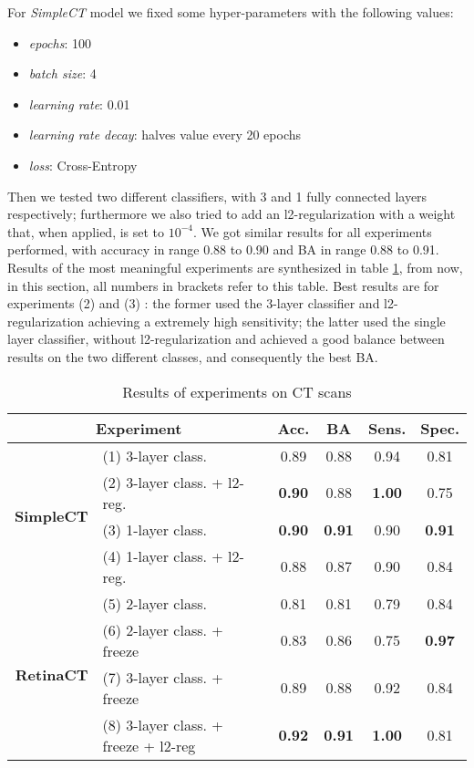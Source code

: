 For \emph{SimpleCT} model we fixed some hyper-parameters with the following values:
\begin{itemize}
    \item \emph{epochs}: 100
    \item \emph{batch size}: 4
    \item \emph{learning rate}: 0.01
    \item \emph{learning rate decay}: halves value every 20 epochs
    \item \emph{loss}: Cross-Entropy
\end{itemize}
Then we tested two different classifiers, with 3 and 1 fully connected layers respectively; furthermore we also tried to add an l2-regularization with a weight that, when applied, is set to $10^{-4}$.
We got similar results for all experiments performed, with accuracy in range 0.88 to 0.90 and BA in range 0.88 to 0.91.
Results of the most meaningful experiments are synthesized in table \ref{tab:ct_results}, from now, in this section, all numbers in brackets refer to this table.
Best results are for experiments (2) and (3) : the former used the 3-layer classifier and l2-regularization achieving a extremely high sensitivity; the latter used the single layer classifier, without l2-regularization and achieved a good balance between results on the two different classes, and consequently the best BA.

\begin{table}
    \centering
    \begin{tabular}{|rl|c|c|c|c|}
        \hline
        \multicolumn{2}{|c|}{\textbf{Experiment}} & \textbf{Acc.} & \textbf{BA} & \textbf{Sens.} & \textbf{Spec.} \\
        \hline
        \multirow{4}{*}{\textbf{SimpleCT}}
        & (1) 3-layer class.           & 0.89          & 0.88          & 0.94          & 0.81 \\
        & (2) 3-layer class. + l2-reg. & \textbf{0.90} & 0.88          & \textbf{1.00} & 0.75 \\
        & (3) 1-layer class.           & \textbf{0.90} & \textbf{0.91} & 0.90          & \textbf{0.91} \\
        & (4) 1-layer class. + l2-reg. & 0.88          & 0.87          & 0.90          & 0.84 \\
        \hline
        \multirow{4}{*}{\textbf{RetinaCT}}
        & (5) 2-layer class.                   & 0.81          & 0.81          & 0.79          & 0.84 \\
        & (6) 2-layer class. + freeze          & 0.83          & 0.86          & 0.75          & \textbf{0.97} \\
        & (7) 3-layer class. + freeze          & 0.89          & 0.88          & 0.92          & 0.84 \\
        & (8) 3-layer class. + freeze + l2-reg & \textbf{0.92} & \textbf{0.91} & \textbf{1.00} & 0.81 \\
        \hline
    \end{tabular}
    \caption{Results of experiments on CT scans}
    \label{tab:ct_results}
\end{table}

